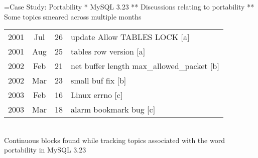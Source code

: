 \documentclass[titlepage,usenames,a4,landscape,semhelv,16pt]{seminar}
\begin{document}
\begin{slide}

=Case Study: Portability
* MySQL 3.23 
** Discussions relating to portability
** Some topics smeared across multiple months


\newslide

\begin{specquotef}
\centering
\begin{tabular}{|ccc|l|}

\hline
2001 &  Jul &  26 &    update Allow TABLES LOCK [a] \\ 

2001 &  Aug &  25 &    tables row version [a] \\
\hline
\hline
2002 &  Feb &  21 &    net buffer length  max\_allowed\_packet [b] \\
2002 &  Mar &  23 &    small buf fix [b]  \\
\hline
\hline
2003 &  Feb &  16 &    Linux errno  [c] \\
2003 &  Mar &  18 &    alarm bookmark bug [c] \\
\hline
\end{tabular} \\
{Continuous blocks found while tracking topics associated with the word portability in MySQL 3.23}
\label{tab:portability}
\end{specquotef}


\end{slide}
\end{document}
